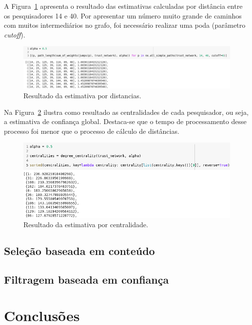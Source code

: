 \documentclass[12pt]{article}
\begin{document}
A Figura~\ref{fig:trust-estimative-distances} apresenta o resultado das estimativas calculadas por distância entre os pesquisadores 14 e 40. Por apresentar um número muito grande de caminhos com muitos intermediários no grafo, foi necessário realizar uma poda (parâmetro \textit{cutoff}).

\begin{figure}[ht]
  \centering
  \includegraphics[width=1\textwidth]{trustest_distances.png}
  \caption{Resultado da estimativa por distancias.}
  \label{fig:trust-estimative-distances}
\end{figure}

Na Figura~\ref{fig:trust-estimative-centrality} ilustra como resultado as centralidades de cada pesquisador, ou seja, a estimativa de confiança global. Destaca-se que o tempo de processamento desse processo foi menor que o processo de cálculo de distâncias. 

\begin{figure}[ht]
  \centering
  \includegraphics[width=1\textwidth]{trustest_code_d.png}
  \caption{Resultado da estimativa por centralidade.}
  \label{fig:trust-estimative-centrality}
\end{figure}

\subsection{Seleção baseada em conteúdo}

\subsection{Filtragem baseada em confiança}

\section{Conclusões}
\end{document}
